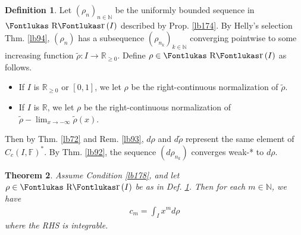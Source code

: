 \documentclass[12pt,b5paper,notitlepage]{article}
\theoremstyle{definition}
\newtheorem{df}{Definition}[subsection]
\theoremstyle{plain}
\newtheorem{thm}[df]{Theorem}
\DeclareMathOperator{\Rr}{\text{\Fontlukas R}\text{\kern -0pt {\Fontlukas\large r}}\,}
\newcommand{\wtd}{\widetilde}
\newcommand{\Nbb}{\mathbb N}
\newcommand{\Rbb}{\mathbb R}
\newcommand{\Fbb}{\mathbb F}
\numberwithin{equation}{section}
\begin{document}
\begin{df}\label{lb175}
Let $(\rho_n)_{n\in\Nbb}$ be the uniformly bounded sequence in $\Rr(I)$ described by Prop. \ref{lb174}. By Helly's selection Thm. \ref{lb94}, $(\rho_n)$ has a subsequence $(\rho_{n_k})_{k\in\Nbb}$ converging pointwise to some increasing function $\wtd\rho:I\rightarrow\Rbb_{\geq0}$. Define $\rho\in\Rr(I)$ as follows.
\begin{itemize}
\item If $I$ is $\Rbb_{\geq0}$ or $[0,1]$, we let $\rho$ be the right-continuous normalization of $\wtd\rho$.
\item If $I$ is $\Rbb$, we let $\rho$ be the right-continuous normalization of $\wtd\rho-\lim_{x\rightarrow-\infty}\wtd\rho(x)$.
\end{itemize}
Then by Thm. \ref{lb72} and Rem. \ref{lb93}, $d\rho$ and $d\wtd\rho$ represent the same element of $C_c(I,\Fbb)^*$. By Thm. \ref{lb92}, the sequence $(d\rho_{n_k})$ converges weak-* to $d\rho$.
\end{df}


\begin{thm}\label{lb177}
Assume Condition \ref{lb178}, and let $\rho\in\Rr(I)$ be as in Def. \ref{lb175}. Then for each $m\in\Nbb$, we have
\begin{align*}
c_m=\int_I x^md\rho
\end{align*}
where the RHS is integrable.
\end{thm}
\end{document}
